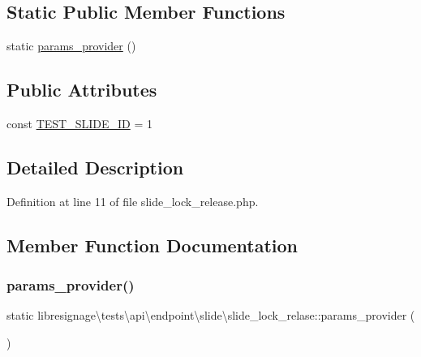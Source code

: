 \subsection*{Static Public Member Functions}
\begin{DoxyCompactItemize}
\item 
static \hyperlink{classlibresignage_1_1tests_1_1api_1_1endpoint_1_1slide_1_1slide__lock__relase_aec8c6bb1b743e06ff2d055e46d7f962a}{params\+\_\+provider} ()
\end{DoxyCompactItemize}
\subsection*{Public Attributes}
\begin{DoxyCompactItemize}
\item 
const \hyperlink{classlibresignage_1_1tests_1_1api_1_1endpoint_1_1slide_1_1slide__lock__relase_aa6d4b1dd627dde256a6888774bde178d}{T\+E\+S\+T\+\_\+\+S\+L\+I\+D\+E\+\_\+\+ID} = \textquotesingle{}1\textquotesingle{}
\end{DoxyCompactItemize}


\subsection{Detailed Description}


Definition at line 11 of file slide\+\_\+lock\+\_\+release.\+php.



\subsection{Member Function Documentation}
\mbox{\label{classlibresignage_1_1tests_1_1api_1_1endpoint_1_1slide_1_1slide__lock__relase_aec8c6bb1b743e06ff2d055e46d7f962a}} 
\subsubsection{\texorpdfstring{params\+\_\+provider()}{params\_provider()}}
{\footnotesize\ttfamily static libresignage\textbackslash{}tests\textbackslash{}api\textbackslash{}endpoint\textbackslash{}slide\textbackslash{}slide\+\_\+lock\+\_\+relase\+::params\+\_\+provider (\begin{DoxyParamCaption}{ }\end{DoxyParamCaption})\hspace{0.3cm}{\ttfamily [static]}}



